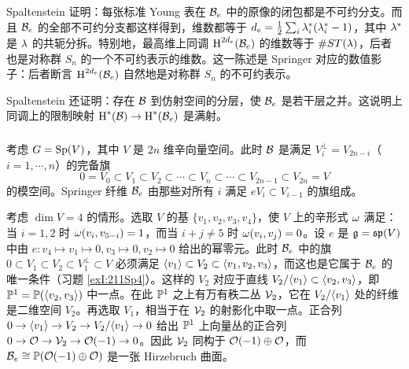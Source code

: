 Spaltenstein \cite[Ch II, Prop 5.5]{Spaltenstein} 证明：每张标准 Young 表在 $\mathcal{B}_{e}$ 中的原像的闭包都是不可约分支。而且 $\mathcal{B}_{e}$ 的全部不可约分支都这样得到，维数都等于 $d_{e}=\frac{1}{2}\sum_{i}\lambda^{*}_{i}(\lambda^{*}_{i}-1)$，其中 $\lambda^{*}$ 是 $\lambda$ 的共轭分拆。特别地，最高维上同调 $\textup{H}^{2d_{e}}({\mathcal{B}_{e}})$ 的维数等于 $\#ST(\lambda)$，后者也是对称群 $S_{n}$ 的一个不可约表示的维数。这一陈述是 Springer 对应的数值影子：后者断言 $\textup{H}^{2d_{e}}({\mathcal{B}_{e}})$ 自然地是对称群 $S_{n}$ 的不可约表示。

Spaltenstein \cite[Ch II, Prop 5.9]{Spaltenstein} 还证明：存在 $\mathcal{B}$ 到仿射空间的分层，使 $\mathcal{B}_{e}$ 是若干层之并。这说明上同调上的限制映射 $\textup{H}^{*}({\mathcal{B}})\to \textup{H}^{*}({\mathcal{B}_{e}})$ 是满射。

\subsubsection{}\label{sss:Sp4} 考虑 $G=\textup{Sp}(V)$，其中 $V$ 是 $2n$ 维辛向量空间。此时 $\mathcal{B}$ 是满足 $V^{\bot}_{i}=V_{2n-i}$（$i=1,\cdots, n$）的完备旗
\begin{equation*}
0=V_{0}\subset V_{1}\subset V_{2}\subset\cdots\subset V_{n}\subset\cdots\subset V_{2n-1}\subset V_{2n}=V
\end{equation*}
的模空间。Springer 纤维 $\mathcal{B}_{e}$ 由那些对所有 $i$ 满足 $eV_{i}\subset V_{i-1}$ 的旗组成。

考虑 $\dim V=4$ 的情形。选取 $V$ 的基 $\{v_{1},v_{2},v_{3},v_{4}\}$，使 $V$ 上的辛形式 $\omega$ 满足：当 $i=1,2$ 时 $\omega(v_{i},v_{5-i})=1$，而当 $i+j\neq 5$ 时 $\omega(v_{i},v_{j})=0$。设 $e$ 是 $\mathfrak{g}=\mathfrak{sp}(V)$ 中由 $e:v_{4}\mapsto v_{1}\mapsto 0, v_{3}\mapsto 0,v_{2}\mapsto 0$ 给出的幂零元。此时 $\mathcal{B}_{e}$ 中的旗 $0\subset V_{1}\subset V_{2}\subset V_{1}^{\bot}\subset V$ 必须满足 $\langle{v_{1}}\rangle\subset V_{2}\subset\langle{v_{1},v_{2},v_{3}}\rangle$，而这也是它属于 $\mathcal{B}_{e}$ 的唯一条件（习题 \ref{exI:211Sp4}）。这样的 $V_{2}$ 对应于直线 $V_{2}/\langle{v_{1}}\rangle\subset \langle{v_{2},v_{3}}\rangle$，即 $\mathbb{P}^{1}=\mathbb{P}(\langle{v_{2},v_{3}}\rangle)$ 中一点。在此 $\mathbb{P}^{1}$ 之上有万有秩二丛 $\mathcal{V}_{2}$，它在 $V_{2}/\langle{v_{1}}\rangle$ 处的纤维是二维空间 $V_{2}$。再选取 $V_{1}$，相当于在 $\mathcal{V}_{2}$ 的射影化中取一点。正合列 $0\to\langle{v_{1}}\rangle\to V_{2}\to V_{2}/\langle{v_{1}}\rangle\to0$ 给出 $\mathbb{P}^{1}$ 上向量丛的正合列 $0\to\mathcal{O}\to\mathcal{V}_{2}\to\mathcal{O}(-1)\to0$。因此 $\mathcal{V}_{2}$ 同构于 $\mathcal{O}(-1)\oplus\mathcal{O}$，而 $\mathcal{B}_{e}\cong \mathbb{P}(\mathcal{O}(-1)\oplus\mathcal{O})$ 是一张 Hirzebruch 曲面。


